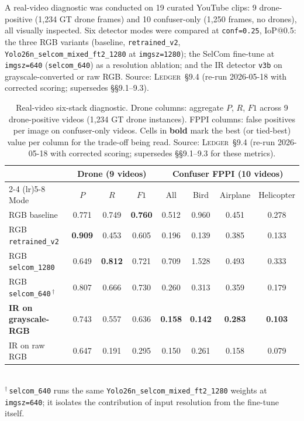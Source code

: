 A real-video diagnostic was conducted on 19 curated YouTube clips: 9 drone-positive (1{,}234 GT drone frames) and 10 confuser-only (1{,}250 frames, no drones), all visually inspected. Six detector modes were compared at \texttt{conf=0.25}, IoP@0.5: the three RGB variants (baseline, \texttt{retrained\_v2}, \texttt{Yolo26n\_selcom\_mixed\_ft2\_1280} at \texttt{imgsz=1280}); the SelCom fine-tune at \texttt{imgsz=640} (\texttt{selcom\_640}) as a resolution ablation; and the IR detector \texttt{v3b} on grayscale-converted or raw RGB. Source: \textsc{Ledger}~\S9.4 (re-run 2026-05-18 with corrected scoring; supersedes \S\S9.1--9.3).

\begin{table}[htbp]
    \centering
    \caption{Real-video six-stack diagnostic. Drone columns: aggregate $P$, $R$, $F1$ across 9 drone-positive videos (1{,}234 GT drone instances). FPPI columns: false positives per image on confuser-only videos. Cells in \textbf{bold} mark the best (or tied-best) value per column for the trade-off being read. Source: \textsc{Ledger}~\S9.4 (re-run 2026-05-18 with corrected scoring; supersedes \S\S9.1--9.3 for these metrics).}
    \label{tab:realvideo_master}
    \begin{tabular}{lccccccc}
        \toprule
        & \multicolumn{3}{c}{Drone (9 videos)} & \multicolumn{4}{c}{Confuser FPPI (10 videos)} \\
        \cmidrule(lr){2-4} \cmidrule(lr){5-8}
        Mode & $P$ & $R$ & $F1$ & All & Bird & Airplane & Helicopter \\
        \midrule
        RGB baseline           & 0.771 & 0.749 & \textbf{0.760} & 0.512 & 0.960 & 0.451 & 0.278 \\
        RGB \texttt{retrained\_v2} & \textbf{0.909} & 0.453 & 0.605 & 0.196 & 0.139 & 0.385 & 0.133 \\
        RGB \texttt{selcom\_1280}  & 0.649 & \textbf{0.812} & 0.721 & 0.709 & 1.528 & 0.493 & 0.333 \\
        RGB \texttt{selcom\_640}\,$^{\dagger}$  & 0.807 & 0.666 & 0.730 & 0.260 & 0.313 & 0.359 & 0.179 \\
        \textbf{IR on grayscale-RGB} & 0.743 & 0.557 & 0.636 & \textbf{0.158} & \textbf{0.142} & \textbf{0.283} & \textbf{0.103} \\
        IR on raw RGB          & 0.647 & 0.191 & 0.295 & 0.150 & 0.261 & 0.158 & 0.079 \\
        \bottomrule
    \end{tabular}
    \\[2pt]
    \footnotesize $^{\dagger}$\,\texttt{selcom\_640} runs the same \texttt{Yolo26n\_selcom\_mixed\_ft2\_1280} weights at \texttt{imgsz=640}; it isolates the contribution of input resolution from the fine-tune itself.
\end{table}

